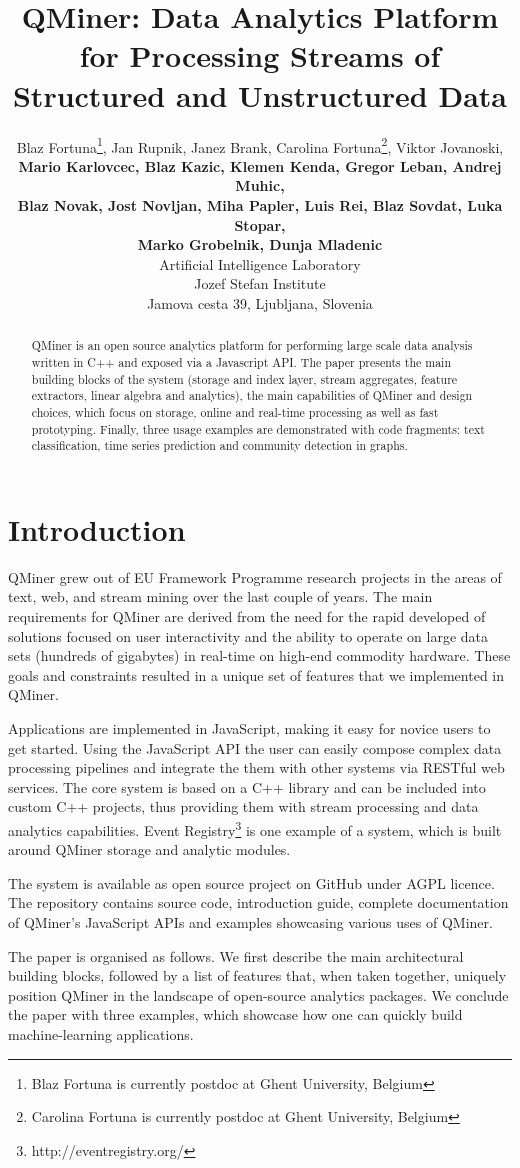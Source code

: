 \documentclass{article} %
\title{QMiner: Data Analytics Platform for Processing Streams of Structured and Unstructured Data}
\author{
Blaz Fortuna\footnote{Blaz Fortuna is currently postdoc at Ghent University, Belgium}, Jan Rupnik, Janez Brank, Carolina Fortuna\footnote{Carolina Fortuna is currently postdoc at Ghent University, Belgium}, Viktor Jovanoski, \\
\textbf{Mario Karlovcec, Blaz Kazic, Klemen Kenda, Gregor Leban, Andrej Muhic,} \\
\textbf{Blaz Novak, Jost Novljan, Miha Papler, Luis Rei, Blaz Sovdat, Luka Stopar,} \\
\textbf{Marko Grobelnik, Dunja Mladenic} \\
Artificial Intelligence Laboratory \\
Jozef Stefan Institute \\
Jamova cesta 39, Ljubljana, Slovenia \\
}
\begin{document}
\maketitle

\begin{abstract}
QMiner is an open source analytics platform for performing large scale data analysis written in C++ and exposed via a Javascript API. The paper presents the main building blocks of the system (storage and index layer, stream aggregates, feature extractors, linear algebra and analytics), the main capabilities of QMiner and design choices, which focus on storage, online and real-time processing as well as fast prototyping. Finally, three usage examples are demonstrated with code fragments: text classification, time series prediction and community detection in graphs.\end{abstract}

\section{Introduction}
QMiner grew out of EU Framework Programme research projects in the areas of text, web, and stream mining over the last couple of years. The main requirements for QMiner are derived from the need for the rapid developed of solutions focused on user interactivity and the ability to operate on large data sets (hundreds of gigabytes) in real-time on high-end commodity hardware. These goals and constraints resulted in a unique set of features that we implemented in QMiner.

Applications are implemented in JavaScript, making it easy for novice users to get started. Using the JavaScript API the user can easily compose complex data processing pipelines and integrate the them with other systems via RESTful web services. The core system is based on a C++ library and can be included into custom C++ projects, thus providing them with stream processing and data analytics capabilities. Event Registry\footnote{http://eventregistry.org/}\cite{eventRegistry} is one example of a system, which is built around QMiner storage and analytic modules.

The system is available as open source project on GitHub under AGPL licence. The repository contains source code, introduction guide, complete documentation of QMiner's JavaScript APIs and examples showcasing various uses of QMiner.

The paper is organised as follows. We first describe the main architectural building blocks, followed by a list of features that, when taken together, uniquely position QMiner in the landscape of open-source analytics packages. We conclude the paper with three examples, which showcase how one can quickly build machine-learning applications.
\end{document}
